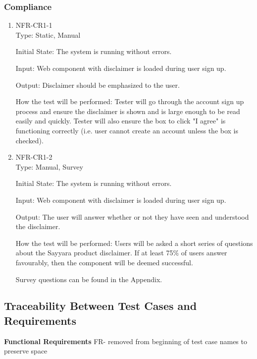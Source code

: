 \documentclass[12pt, titlepage]{article}
\begin{document}
\subsubsection{Compliance}

\begin{enumerate}

\item{NFR-CR1-1}\\

Type: Static, Manual

Initial State: The system is running without errors.

Input: Web component with disclaimer is loaded during user sign up.

Output: Disclaimer should be emphasized to the user.

How the test will be performed: Tester will go through the account sign up process and ensure the disclaimer is shown and is large enough to be read easily and quickly. Tester will also ensure the box to click "I agree" is functioning correctly (i.e. user cannot create an account unless the box is checked).

\item{NFR-CR1-2}\\

Type: Manual, Survey

Initial State: The system is running without errors.

Input: Web component with disclaimer is loaded during user sign up.

Output: The user will answer whether or not they have seen and understood the disclaimer.

How the test will be performed: Users will be asked a short series of questions about the Sayyara product disclaimer. If at least 75\% of users answer favourably, then the component will be deemed successful.

Survey questions can be found in the Appendix.

\end{enumerate}

\subsection{Traceability Between Test Cases and Requirements}

\noindent \textbf{Functional Requirements}
FR- removed from beginning of test case names to preserve space\\
\end{document}
